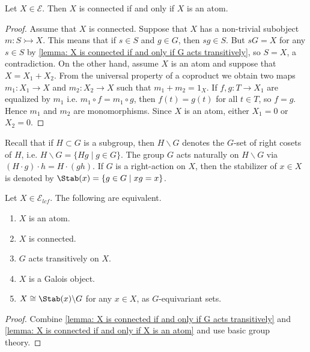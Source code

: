 \begin{lemma}
\label{lemma: X is connected if and only if X is an atom}
Let $X \in \mathscr{E}$. Then $X$ is connected if and only if $X$ is an atom.
\end{lemma}
\begin{proof}
Assume that $X$ is connected. Suppose that $X$ has a non-trivial subobject $m : S \rightarrowtail X$. This means that if $s \in S$ and $g \in G$, then $sg \in S$. But $sG = X$ for any $s \in S$ by \cref{lemma: X is connected if and only if G acts transitively}, so $S = X$, a contradiction. On the other hand, assume $X$ is an atom and suppose that $X = X_1 + X_2$. From the universal property of a coproduct we obtain two maps $m_1 : X_1 \to X$ and $m_2 : X_2 \to X$ such that $m_1 + m_2 = 1_X$. If $f,g : T \to X_1$ are equalized by $m_1$ i.e. $m_1 \circ f = m_1 \circ g$, then $f(t) = g(t)$ for all $t \in T$, so $f = g$. Hence $m_1$ and $m_2$ are monomorphisms. Since $X$ is an atom, either $X_1 = 0$ or $X_2 = 0$.
\end{proof}
Recall that if $H \subset G$ is a subgroup, then $H \backslash G$ denotes the $G$-set of right cosets of $H$, i.e. $H \backslash G = \{Hg \mid g \in G\}$. The group $G$ acts naturally on $H\backslash G$ via $(H \cdot g) \cdot h = H \cdot (gh)$. If $G$ is a right-action on $X$, then the stabilizer of $x \in X$ is denoted by $\Stab(x) = \{g \in G \mid xg = x\}$.
\begin{proposition}
\label{proposition: characterizations of Galois objects in the topos of G-sets}
Let $X \in \mathscr{E}_{lcf}$. The following are equivalent.
\begin{enumerate}
	\item $X$ is an atom.
	\item $X$ is connected.
	\item $G$ acts transitively on $X$.
	\item $X$ is a Galois object.
	\item $X \cong \Stab(x) \backslash G$ for any $x \in X$, as $G$-equivariant sets.
\end{enumerate}
\end{proposition}
\begin{proof}
Combine \cref{lemma: X is connected if and only if G acts transitively} and \cref{lemma: X is connected if and only if X is an atom} and use basic group theory.
\end{proof}

